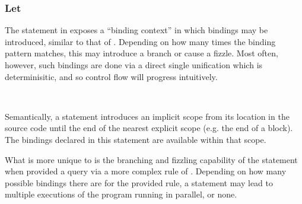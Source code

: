 \subsubsection{Let}

The  statement in \Prose{} exposes a ``binding context'' in which
bindings may be introduced, similar to that of \Law{}. Depending on how many times
the binding pattern matches, this may introduce a branch or cause a fizzle.
Most often, however, such bindings are done via a direct single unification
which is determinisitic, and so control flow will progress intuitively.

\begin{bnf*}
     \\
\end{bnf*}

Semantically, a  statement introduces an implicit scope from its location
in the source code until the end of the nearest explicit scope (e.g. the end of a block).
The bindings declared in this statement are available within that scope.

What is more unique to \Trilogy{} is the branching and fizzling capability of the
 statement when provided a query via a more complex rule of \Law{}.
Depending on how many possible bindings there are for the provided rule, a 
statement may lead to multiple executions of the program running in parallel, or none.

\begin{prooftree}
\end{prooftree}

